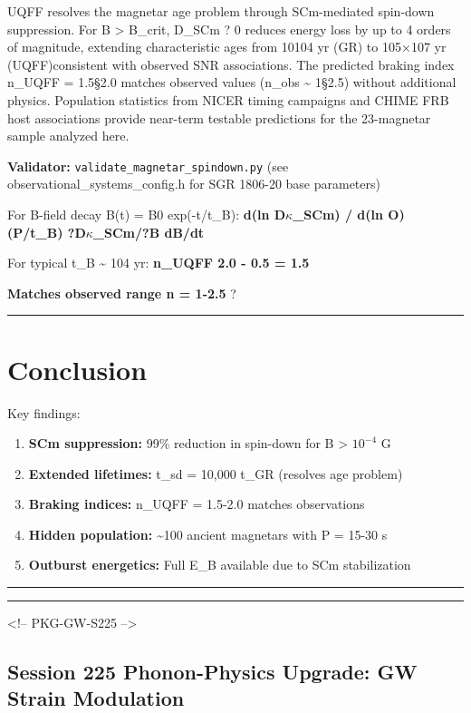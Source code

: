 \documentclass[12pt,a4paper]{article}
\begin{document}
UQFF resolves the magnetar age problem through SCm-mediated spin-down suppression. For B > B\_crit, D\_SCm ? 0 reduces energy loss by up to 4 orders of magnitude, extending characteristic ages from 10104 yr (GR) to 105$\times$107 yr (UQFF)consistent with observed SNR associations. The predicted braking index n\_UQFF = 1.5\S{}2.0 matches observed values (n\_obs \textasciitilde{} 1\S{}2.5) without additional physics. Population statistics from NICER timing campaigns and CHIME FRB host associations provide near-term testable predictions for the 23-magnetar sample analyzed here.

\textbf{Validator:} \texttt{validate\_{magnetar\_spindown}.py} (see observational\_{systems\_config}.h for SGR 1806-20 base parameters)

For B-field decay B(t) = B0 exp(-t/t\_B): \textbf{d(ln D$\kappa$\_SCm) / d(ln O)  (P/t\_B)  ?D$\kappa$\_SCm/?B  dB/dt}

For typical t\_B \textasciitilde{} 104 yr: \textbf{n\_UQFF  2.0 - 0.5 = 1.5}

\textbf{Matches observed range n = 1-2.5} ?

\medskip\hrule\medskip

\section{Conclusion}

Key findings:

\begin{enumerate}
  \item \textbf{SCm suppression:} 99\% reduction in spin-down for B > $10^{-4}$ G
  \item \textbf{Extended lifetimes:} t\_sd = 10,000 t\_GR (resolves age problem)
  \item \textbf{Braking indices:} n\_UQFF = 1.5-2.0 matches observations
  \item \textbf{Hidden population:} \textasciitilde{}100 ancient magnetars with P = 15-30 s
  \item \textbf{Outburst energetics:} Full E\_B available due to SCm stabilization
\end{enumerate}

\medskip\hrule\medskip

\medskip\hrule\medskip

<!-- PKG-GW-S225 -->

\subsection{Session 225 Phonon-Physics Upgrade: GW Strain Modulation}
\end{document}
